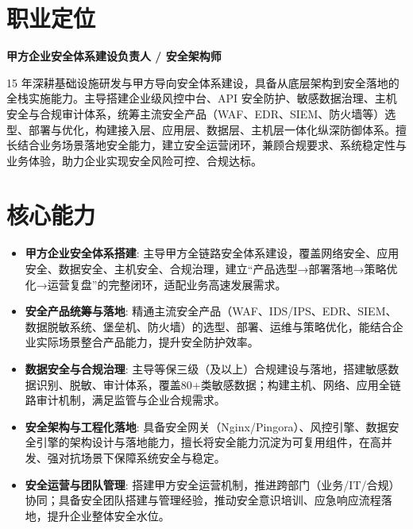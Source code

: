 


\section{职业定位}

\sloppy
\textbf{甲方企业安全体系建设负责人 / 安全架构师}

15 年深耕基础设施研发与甲方导向安全体系建设，具备从底层架构到安全落地的全栈实施能力。主导搭建企业级风控中台、API 安全防护、敏感数据治理、主机安全与合规审计体系，统筹主流安全产品（WAF、EDR、SIEM、防火墙等）选型、部署与优化，构建接入层、应用层、数据层、主机层一体化纵深防御体系。擅长结合业务场景落地安全能力，建立安全运营闭环，兼顾合规要求、系统稳定性与业务体验，助力企业实现安全风险可控、合规达标。

\vspace{0.10cm}

\section{核心能力}
\begin{itemize}[parsep=0.2ex]
  \item \textbf{甲方企业安全体系搭建}: 主导甲方全链路安全体系建设，覆盖网络安全、应用安全、数据安全、主机安全、合规治理，建立“产品选型→部署落地→策略优化→运营复盘”的完整闭环，适配业务高速发展需求。
  \item \textbf{安全产品统筹与落地}: 精通主流安全产品（WAF、IDS/IPS、EDR、SIEM、数据脱敏系统、堡垒机、防火墙）的选型、部署、运维与策略优化，能结合企业实际场景整合产品能力，提升安全防护效率。
  \item \textbf{数据安全与合规治理}: 主导等保三级（及以上）合规建设与落地，搭建敏感数据识别、脱敏、审计体系，覆盖80+类敏感数据；构建主机、网络、应用全链路审计机制，满足监管与企业合规需求。
  \item \textbf{安全架构与工程化落地}: 具备安全网关（Nginx/Pingora）、风控引擎、数据安全引擎的架构设计与落地能力，擅长将安全能力沉淀为可复用组件，在高并发、强对抗场景下保障系统安全与稳定。
  \item \textbf{安全运营与团队管理}: 搭建甲方安全运营机制，推进跨部门（业务/IT/合规）协同；具备安全团队搭建与管理经验，推动安全意识培训、应急响应流程落地，提升企业整体安全水位。
\end{itemize}

